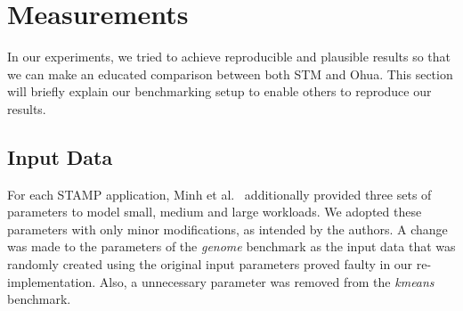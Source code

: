 \section{Measurements}
\label{sec:experiments:measurements}

In our experiments, we tried to achieve reproducible and plausible results so that we can make an educated comparison between both STM and Ohua.
This section will briefly explain our benchmarking setup to enable others to reproduce our results.

\subsection{Input Data}
\label{sec:experiments:measurements:inputs}

For each STAMP application, Minh et al.~\cite{minh2008stamp} additionally provided three sets of parameters to model small, medium and large workloads.
We adopted these parameters with only minor modifications, as intended by the authors.
A change was made to the parameters of the \emph{genome} benchmark as the input data that was randomly created using the original input parameters proved faulty in our re-implementation.
Also, a unnecessary parameter was removed from the \emph{kmeans} benchmark.


